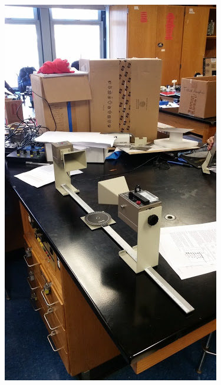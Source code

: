 \documentclass[11pt, titlepage]{article}
\begin{document}
\begin{figure}[h]
\centering
\hspace*{0cm}
\includegraphics[scale=1]{lab61.jpg}
\vspace*{0cm}
\end{figure}
\end{document}
